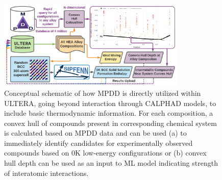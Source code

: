 \begin{figure}[H]
    \centering
    \includegraphics[width=0.8\textwidth]{ultera/ULTERA_BasicThermodynamics_V1.png}
    \caption{Conceptual schematic of how MPDD is directly utilized within ULTERA, going beyond interaction through CALPHAD models, to include basic thermodynamic information. For each composition, a convex hull of compounds present in corresponding chemical system is calculated based on MPDD data and can be used (a) to immediately identify candidates for experimentally observed compounds based on 0K low-energy configurations or (b) convex hull depth can be used as an input to ML model indicating strength of interatomic interactions.}
    \label{ultera:fig:mpdd}
\end{figure}








\printbibliography[heading=subbibintoc]
